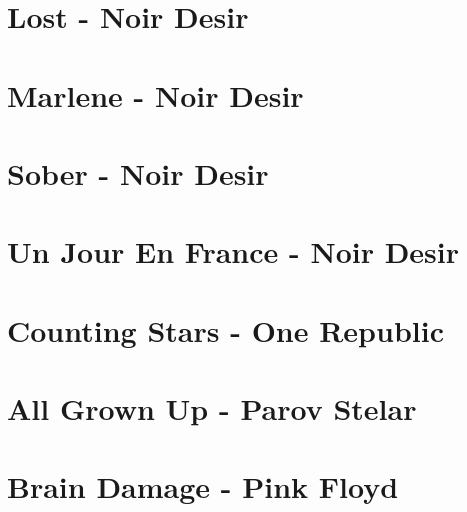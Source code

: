\documentclass{guitartabs}
\begin{document}
\section*{Lost - Noir Desir}
\begin{guitar}

\end{guitar}

\section{Marlene - Noir Desir}
\begin{guitar}

\end{guitar}

\section*{Sober - Noir Desir}
\begin{guitar}

\end{guitar}


\section*{Un Jour En France - Noir Desir}
\begin{guitar}

\end{guitar}

\section{Counting Stars - One Republic}
\begin{guitar}

\end{guitar}

\section{All Grown Up - Parov Stelar}
\begin{guitar}

\end{guitar}


\section*{Brain Damage - Pink Floyd}
\begin{guitar}

\end{guitar}
\end{document}
